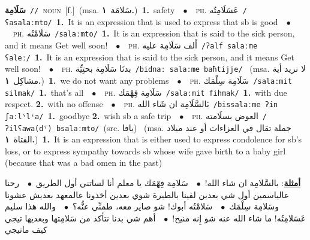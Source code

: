 \documentclass[10pt,a4paper,twoside]{article} %
\begin{document}
\begin{multicols}{2}
{\setlength\topsep{0pt}\textbf{\foreignlanguage{arabic}{سَلَامِة}}\ {\color{gray}\texttt{//}\color{black}}\ \textsc{noun}\ [f.]\ \color{gray}(msa. \foreignlanguage{arabic}{سَلامَة}~\foreignlanguage{arabic}{\textbf{١.}})\color{black}\ \textbf{1.}~safety\ \ $\bullet$\ \ \textsc{ph.} \color{gray} \foreignlanguage{arabic}{عَسَلَامِتُه}\color{black}\ {\color{gray}\texttt{/{\sffamily ʕasalaːmto}/}\color{black}}\ \textbf{1.}~It is an expression that is used to express that sb is good\ \ $\bullet$\ \ \textsc{ph.} \color{gray} \foreignlanguage{arabic}{سَلَامْتُه}\color{black}\ {\color{gray}\texttt{/{\sffamily salaːmto}/}\color{black}}\ \textbf{1.}~It is an expression that is said to the sick person, and it means Get well soon!\ \ $\bullet$\ \ \textsc{ph.} \color{gray} \foreignlanguage{arabic}{أَلف سَلَامِة عليه}\color{black}\ {\color{gray}\texttt{/{\sffamily ʔalf salaːme ʕaleː}/}\color{black}}\ \textbf{1.}~It is an expression that is said to the sick person, and it means Get well soon!\ \ $\bullet$\ \ \textsc{ph.} \color{gray} \foreignlanguage{arabic}{بدنَا سَلَامِة بحتِيِّة}\color{black}\ {\color{gray}\texttt{/{\sffamily bidnaː salaːme baħtijje}/}\color{black}}\ \color{gray} (msa. \foreignlanguage{arabic}{لا نريد أية مشاكِل}~\foreignlanguage{arabic}{\textbf{١.}})\color{black}\ \textbf{1.}~we do not want any problems\ \ $\bullet$\ \ \textsc{ph.} \color{gray} \foreignlanguage{arabic}{سَلَامِة سِلْمَك}\color{black}\ {\color{gray}\texttt{/{\sffamily salaːmit silmak}/}\color{black}}\ \textbf{1.}~that's all\ \ $\bullet$\ \ \textsc{ph.} \color{gray} \foreignlanguage{arabic}{سَلَامِة فِهْمَك}\color{black}\ {\color{gray}\texttt{/{\sffamily salaːmit fihmak}/}\color{black}}\ \textbf{1.}~with due respect.  \textbf{2.}~with no offense\ \ $\bullet$\ \ \textsc{ph.} \color{gray} \foreignlanguage{arabic}{بَالسَّلَامِة ان شَاء الله}\color{black}\ {\color{gray}\texttt{/{\sffamily bissalaːme ʔin ʃaːlˤlˤa}/}\color{black}}\ \textbf{1.}~goodbye  \textbf{2.}~wish sb a safe trip\ \ $\bullet$\ \ \textsc{ph.} \color{gray} \foreignlanguage{arabic}{العوض بسلَامته}\color{black}\ {\color{gray}\texttt{/{\sffamily ʔilʕawa(dˤ) bsalaːmto}/}\color{black}}\ \color{gray}(src. \foreignlanguage{arabic}{يافا})\color{black}\ \color{gray} (msa. \foreignlanguage{arabic}{جملة تقال في العزاءات أو عند ميلاد الفتاة}~\foreignlanguage{arabic}{\textbf{١.}})\color{black}\ \textbf{1.}~It is an expression that is either used to express condolence for sb's loss, or to express sympathy towards sb whose wife gave birth to a baby girl (because that was a bad omen in the past)\  \begin{flushright}\color{gray}\foreignlanguage{arabic}{\textbf{\underline{\foreignlanguage{arabic}{أمثلة}}}: بالسَّلامِة ان شاء الله!\ $\bullet$\ \  سَلامِة فِهْمَك يا معلم أنا لساتني أول الطريق\ $\bullet$\ \  رحنا عالياسمين أول شي بعدين لفينا بالطيرة شوي بعدين أخذونا عالمعهد بعديش عشونا وسَلامِة سِلْمَك\ $\bullet$\ \  سَلامْتُه أبوك! شو صاير معه، طمنِّي عنُّه؟\ $\bullet$\ \  والله هذا سليم عَسَلامِتُه! ما شاء الله عنه شو إِنه منيح!\ $\bullet$\ \  أهم شي بدنا نتأكد من سَلامِتها وبعديها تيجي كيف ماتيجي}\end{flushright}\color{black}} \vspace{2mm}


\end{multicols}
\end{document}
